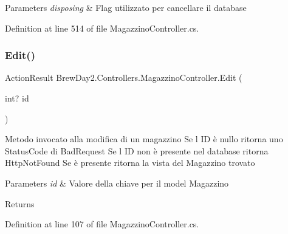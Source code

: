 \begin{DoxyParams}{Parameters}
{\em disposing} & Flag utilizzato per cancellare il database\\
\hline
\end{DoxyParams}


Definition at line 514 of file Magazzino\+Controller.\+cs.

\mbox{\label{class_brew_day2_1_1_controllers_1_1_magazzino_controller_a8822a7c1a8acad0baddec3c39f522d28}} 
\subsubsection{\texorpdfstring{Edit()}{Edit()}\hspace{0.1cm}{\footnotesize\ttfamily [1/2]}}
{\footnotesize\ttfamily Action\+Result Brew\+Day2.\+Controllers.\+Magazzino\+Controller.\+Edit (\begin{DoxyParamCaption}\item[{int?}]{id }\end{DoxyParamCaption})}

Metodo invocato alla modifica di un magazzino Se l\textquotesingle{} ID è nullo ritorna uno Status\+Code di Bad\+Request Se l\textquotesingle{} ID non è presente nel database ritorna Http\+Not\+Found Se è presente ritorna la vista del Magazzino trovato 
\begin{DoxyParams}{Parameters}
{\em id} & Valore della chiave per il model Magazzino\\
\hline
\end{DoxyParams}
\begin{DoxyReturn}{Returns}

\end{DoxyReturn}


Definition at line 107 of file Magazzino\+Controller.\+cs.

\mbox{\label{class_brew_day2_1_1_controllers_1_1_magazzino_controller_af8b07601ae4d2c4dedba7a95b029347c}} 
